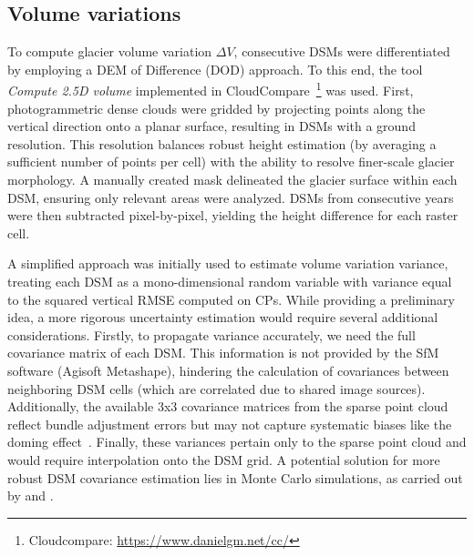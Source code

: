 

\subsection{Volume variations}\label{sec:3:method_volumes}

To compute glacier volume variation $ \Delta V $, consecutive DSMs were differentiated
by employing a DEM of Difference (DOD) approach.
To this end, the tool \textit{Compute 2.5D volume} implemented in 
CloudCompare~\footnote{Cloudcompare: \url{https://www.danielgm.net/cc/}} was used.
First, photogrammetric dense clouds were gridded by projecting points along the vertical
direction onto a planar surface, resulting in DSMs with a  ground resolution.
This resolution balances robust height estimation (by averaging a sufficient number of points per cell) 
with the ability to resolve finer-scale glacier morphology.
A manually created mask delineated the glacier surface within each DSM, ensuring only 
relevant areas were analyzed.  
DSMs from consecutive years were then subtracted pixel-by-pixel, yielding the height 
difference for each raster cell.

A simplified approach was initially used to estimate volume variation variance, 
treating each DSM as a mono-dimensional random variable with variance equal to the squared 
vertical RMSE computed on CPs.  
While providing a preliminary idea, a more rigorous uncertainty estimation would require 
several additional considerations.
Firstly, to propagate variance accurately, we need the full covariance matrix of each DSM. 
This information is not provided by the SfM software (Agisoft Metashape), hindering the 
calculation of covariances between neighboring DSM cells (which are correlated due to 
shared image sources).
Additionally, the available 3x3 covariance matrices from the sparse point cloud reflect
bundle adjustment errors but may not capture systematic biases like the doming 
effect~\citep{James2014_mitigating, James2020_mitigating2}.
Finally, these variances pertain only to the sparse point cloud and would require 
interpolation onto the DSM grid.
A potential solution for more robust DSM covariance estimation lies in Monte Carlo simulations, 
as carried out by \citet{James2017_3duncertainty} and \citet{Roncella2021_montecarlo}.

